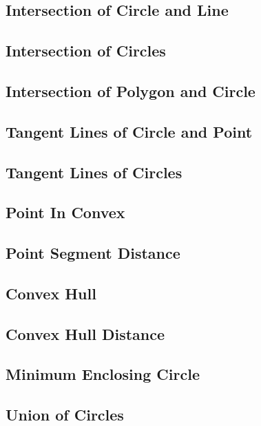 \subsection{Intersection of Circle and Line}

\subsection{Intersection of Circles}

\subsection{Intersection of Polygon and Circle}

\subsection{Tangent Lines of Circle and Point}

\subsection{Tangent Lines of Circles}

\subsection{Point In Convex}

\subsection{Point Segment Distance}

\subsection{Convex Hull}

\subsection{Convex Hull Distance}

\subsection{Minimum Enclosing Circle}

\subsection{Union of Circles}

